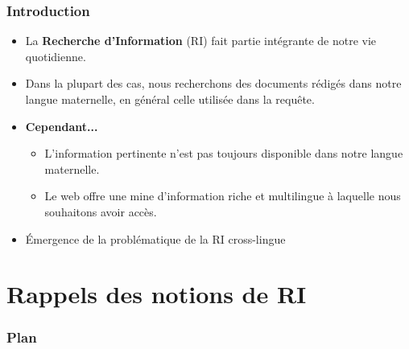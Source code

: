 \documentclass[12pt,aspectratio=43,dvipsnames,table]{beamer}
\begin{document}
\begin{frame}
    \frametitle{Introduction}
    \begin{itemize} \itemsep10pt
        \item La \textbf{Recherche d'Information} (RI) fait partie intégrante de
              notre vie quotidienne.
        \item Dans la plupart des cas, nous recherchons des documents rédigés 
              dans notre langue maternelle, en général celle utilisée dans la 
              requête.
        \item \textbf{Cependant...}
        \begin{itemize}
            \item L'information pertinente n'est pas toujours disponible dans 
                  notre langue maternelle.
            \item Le web offre une mine d'information riche et multilingue à 
                  laquelle nous souhaitons avoir accès.
        \end{itemize}
        \item \'Emergence de la problématique de la RI cross-lingue
    \end{itemize}
\end{frame}


\section{Rappels des notions de RI}


\begin{frame}
\frametitle{Plan}
\tableofcontents[sectionstyle=show,subsectionstyle=hide,subsubsectionstyle=hide]
\end{frame}
\end{document}
